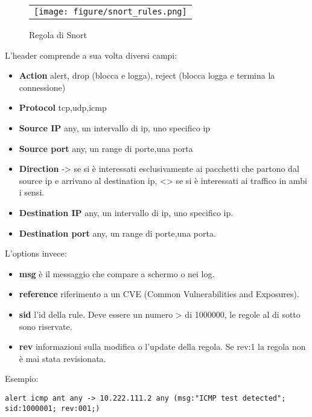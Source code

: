 \begin{figure}[h]
    \begin{center}
        \begin{tabular}{l}
            \texttt{[image: figure/snort\_rules.png]}
        \end{tabular}
    \end{center}
    \caption{Regola di Snort}
\end{figure}

L'header comprende a sua volta diversi campi:

\begin{itemize}
    \item \textbf{Action} alert, drop (blocca e logga), reject (blocca logga e termina la connessione)
    \item \textbf{Protocol} tcp,udp,icmp
    \item \textbf{Source IP}  any, un intervallo di ip, uno specifico ip
    \item \textbf{Source port} any, un range di porte,una porta
    \item \textbf{Direction} -> se si è interessati esclusivamente ai pacchetti che partono dal source ip e arrivano al destination ip, <> se si è interessati ai traffico in ambi i sensi.
    \item \textbf{Destination IP} any, un intervallo di ip, uno specifico ip.
    \item \textbf{Destination port} any, un range di porte,una porta.
\end{itemize}

L'options invece:

\begin{itemize}
    \item \textbf{msg}  è il messaggio che compare a schermo o nei log.
    \item \textbf{reference} riferimento a un CVE (Common Vulnerabilities and Exposures).
    \item \textbf{sid} l'id della rule. Deve essere un numero > di 1000000, le regole al di sotto sono riservate.
    \item \textbf{rev} informazioni sulla modifica o l'update della regola. Se rev:1 la regola non è mai stata revisionata.
\end{itemize}

Esempio:

\begin{verbatim}
alert icmp ant any -> 10.222.111.2 any (msg:"ICMP test detected"; 
sid:1000001; rev:001;)
\end{verbatim}

